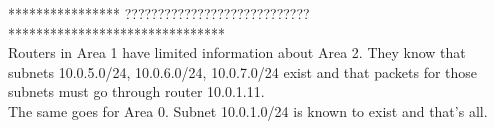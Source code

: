 **************** ???????????????????????????? ******************************* \\
Routers in Area 1 have limited information about Area 2. They know that subnets 10.0.5.0/24, 10.0.6.0/24, 10.0.7.0/24 exist and that packets for those subnets must go through router 10.0.1.11. \\
The same goes for Area 0. Subnet 10.0.1.0/24 is known to exist and that's all.
